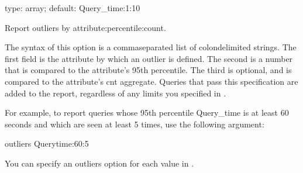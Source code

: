 \documentclass[letterpaper,10pt,english]{sphinxmanual}
\begin{document}
\begin{fulllineitems}
\label{\detokenize{mariadb-query-digest:cmdoption-mariadb-query-digest-outliers}}
\sphinxAtStartPar
type: array; default: Query\_time:1:10

\sphinxAtStartPar
Report outliers by attribute:percentile:count.

\sphinxAtStartPar
The syntax of this option is a comma\sphinxhyphen{}separated list of colon\sphinxhyphen{}delimited strings.
The first field is the attribute by which an outlier is defined.  The second is
a number that is compared to the attribute’s 95th percentile.  The third is
optional, and is compared to the attribute’s cnt aggregate.  Queries that pass
this specification are added to the report, regardless of any limits you
specified in {\hyperref[\detokenize{mariadb-query-digest:cmdoption-mariadb-query-digest-limit}]{}}.

\sphinxAtStartPar
For example, to report queries whose 95th percentile Query\_time is at least 60
seconds and which are seen at least 5 times, use the following argument:

\begin{sphinxVerbatim}[commandchars=\\\{\}]
\PYGZhy{}\PYGZhy{}outliers Query\PYGZus{}time:60:5
\end{sphinxVerbatim}

\sphinxAtStartPar
You can specify an \textendash{}outliers option for each value in {\hyperref[\detokenize{mariadb-query-digest:cmdoption-mariadb-query-digest-group-by}]{}}.

\end{fulllineitems}

\end{document}
